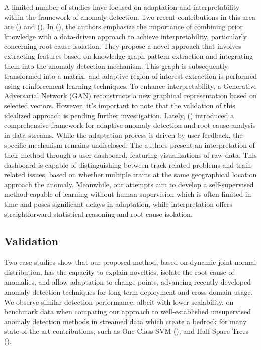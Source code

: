 A limited number of studies have focused on adaptation and interpretability within the framework of anomaly detection. Two recent contributions in this area are (\cite{Steenwinckel2018}) and (\cite{Steenwinckel2021}). In (\cite{Steenwinckel2018}), the authors emphasize the importance of combining prior knowledge with a data-driven approach to achieve interpretability, particularly concerning root cause isolation. They propose a novel approach that involves extracting features based on knowledge graph pattern extraction and integrating them into the anomaly detection mechanism. This graph is subsequently transformed into a matrix, and adaptive region-of-interest extraction is performed using reinforcement learning techniques. To enhance interpretability, a Generative Adversarial Network (GAN) reconstructs a new graphical representation based on selected vectors. However, it's important to note that the validation of this idealized approach is pending further investigation. Lately, (\cite{Steenwinckel2021}) introduced a comprehensive framework for adaptive anomaly detection and root cause analysis in data streams. While the adaptation process is driven by user feedback, the specific mechanism remains undisclosed. The authors present an interpretation of their method through a user dashboard, featuring visualizations of raw data. This dashboard is capable of distinguishing between track-related problems and train-related issues, based on whether multiple trains at the same geographical location approach the anomaly. Meanwhile, our attempts aim to develop a self-supervised method capable of learning without human supervision which is often limited in time and poses significant delays in adaptation, while interpretation offers straightforward statistical reasoning and root cause isolation.

\subsection{Validation}\label{par:validation}
Two case studies show that our proposed method, based on dynamic joint normal distribution, has the capacity to explain novelties, isolate the root cause of anomalies, and allow adaptation to change points, advancing recently developed anomaly detection techniques for long-term deployment and cross-domain usage. We observe similar detection performance, albeit with lower scalability, on benchmark data when comparing our approach to well-established unsupervised anomaly detection methods in streamed data which create a bedrock for many state-of-the-art contributions, such as One-Class SVM (\cite{Amer2013, Liu2014, Krawczyk2015, Miao2019, Gozuacik2021}), and Half-Space Trees (\cite{Wetzig2019, Lyu2020}).

